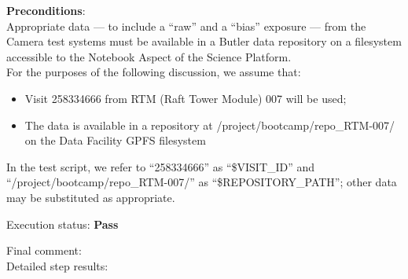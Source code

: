 \documentclass[DM,lsstdraft,STR,toc]{lsstdoc}
\providecommand{\tightlist}{
  \setlength{\itemsep}{0pt}\setlength{\parskip}{0pt}}
\begin{document}
    {\bf Preconditions}:\\
    Appropriate data --- to include a ``raw'' and a ``bias'' exposure ---
from the Camera test systems must be available in a Butler data
repository on a filesystem accessible to the Notebook Aspect of the
Science Platform.\\[2\baselineskip]For the purposes of the following
discussion, we assume that:\\[2\baselineskip]

\begin{itemize}
\tightlist
\item
  Visit 258334666 from RTM (Raft Tower Module) 007 will be used;
\item
  The data is available in a repository at
  /project/bootcamp/repo\_RTM-007/ on the Data Facility GPFS filesystem
\end{itemize}

In the test script, we refer to ``258334666'' as ``\$VISIT\_ID'' and
``/project/bootcamp/repo\_RTM-007/'' as ``\$REPOSITORY\_PATH''; other
data may be substituted as appropriate.


    Execution status: {\bf Pass }

    Final comment:\\


    Detailed step results:
\end{document}
